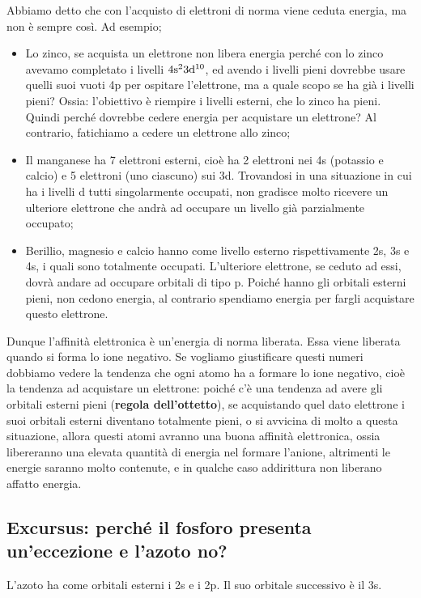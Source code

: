 \vspace{-1cm}

Abbiamo detto che con l'acquisto di elettroni di norma viene ceduta energia, ma non è sempre così. Ad esempio; 
\begin{itemize}
    \item Lo zinco, se acquista un elettrone non libera energia perché con lo zinco avevamo completato i livelli $\rm 4s^23d^{10}$, ed avendo i livelli pieni dovrebbe usare quelli suoi vuoti 4p per ospitare l'elettrone, ma a quale scopo se ha già i livelli pieni? Ossia: l'obiettivo è riempire i livelli esterni, che lo zinco ha pieni. Quindi perché dovrebbe cedere energia per acquistare un elettrone? Al contrario, fatichiamo a cedere un elettrone allo zinco;
    \item Il manganese ha 7 elettroni esterni, cioè ha 2 elettroni nei 4s (potassio e calcio) e 5 elettroni (uno ciascuno) sui 3d. Trovandosi in una situazione in cui ha i livelli d tutti singolarmente occupati, non gradisce molto ricevere un ulteriore elettrone che andrà ad occupare un livello già parzialmente occupato;
    \item Berillio, magnesio e calcio hanno come livello esterno rispettivamente 2s, 3s e 4s, i quali sono totalmente occupati. L'ulteriore elettrone, se ceduto ad essi, dovrà andare ad occupare orbitali di tipo p. Poiché hanno gli orbitali esterni pieni, non cedono energia, al contrario spendiamo energia per fargli acquistare questo elettrone.
\end{itemize}

Dunque l'affinità elettronica è un'energia di norma liberata. Essa viene liberata quando si forma lo ione negativo. Se vogliamo giustificare questi numeri dobbiamo vedere la tendenza che ogni atomo ha a formare lo ione negativo, cioè la tendenza ad acquistare un elettrone: poiché c'è una tendenza ad avere gli orbitali esterni pieni (\textbf{regola dell'ottetto}), se acquistando quel dato elettrone i suoi orbitali esterni diventano totalmente pieni, o si avvicina di molto a questa situazione, allora questi atomi avranno una buona affinità elettronica, ossia libereranno una elevata quantità di energia nel formare l'anione, altrimenti le energie saranno molto contenute, e in qualche caso addirittura non liberano affatto energia.
\subsection{Excursus: perché il fosforo presenta un'eccezione e l'azoto no?}
L'azoto ha come orbitali esterni i 2s e i 2p. Il suo orbitale successivo è il 3s.

